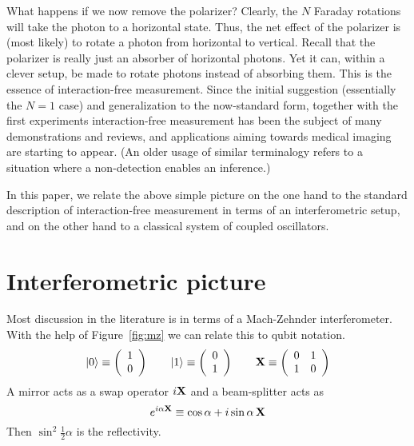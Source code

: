 \documentclass[12pt,aps,prb,preprint]{revtex4}
\def\ket#1{|#1\rangle}
\def\X{{\bf X}}
\begin{document}
What happens if we now remove the polarizer?  Clearly, the $N$ Faraday
rotations will take the photon to a horizontal state.  Thus, the net
effect of the polarizer is (most likely) to rotate a photon from
horizontal to vertical.  Recall that the polarizer is really just an
absorber of horizontal photons.  Yet it can, within a clever setup, be
made to rotate photons instead of absorbing them.  This is the essence
of interaction-free measurement.  Since the initial suggestion
(essentially the $N=1$ case)\cite{1993FoPh...23..987E} and
generalization to the now-standard form, together with the first
experiments\cite{PhysRevLett.74.4763} interaction-free measurement has
been the subject of many
demonstrations\cite{voorthuysen:1504,2006JPhB...39.3177N} and
reviews,\cite{deweerd:272} and applications aiming towards medical
imaging are starting to appear\cite{PhysRevA.80.040902}.  (An older
usage of similar
terminalogy\cite{springerlink:10.1007/BF01327019,dicke:925} refers to
a situation where a non-detection enables an inference.)

In this paper, we relate the above simple picture on the one hand to
the standard description of interaction-free measurement in terms of
an interferometric setup, and on the other hand to a classical system
of coupled oscillators.

\section{Interferometric picture}

Most discussion in the literature is in terms of a Mach-Zehnder
interferometer.  With the help of Figure~{\ref{fig:mz}} we can relate
this to qubit notation.
\begin{equation}
\ket0 \equiv \left( \begin{array}{c} 1 \\ 0 \end{array} \right)  \qquad
\ket1 \equiv \left( \begin{array}{c} 0 \\ 1 \end{array} \right)  \qquad
\X \equiv \left( \begin{array}{cc} 0 & 1 \\ 1 & 0 \end{array} \right)
\end{equation}
A mirror acts as a swap operator $i\X$ and a beam-splitter acts as
\begin{equation}
e^{i\alpha\X} \equiv \cos\alpha + i\sin\alpha\,\X
\end{equation}
Then $\sin^2\frac12\alpha$ is the reflectivity.
\end{document}
